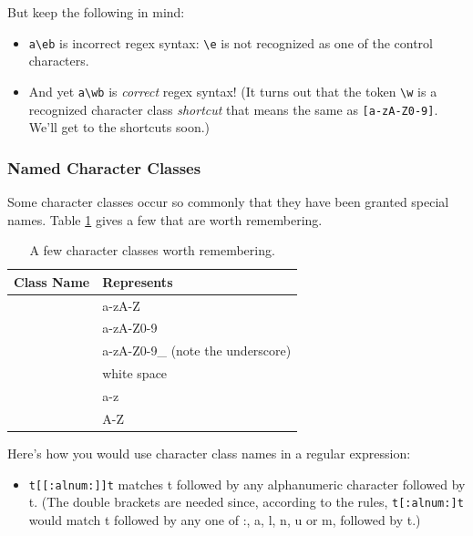 \documentclass[]{book}
\providecommand{\tightlist}{%
  \setlength{\itemsep}{0pt}\setlength{\parskip}{0pt}}
\theoremstyle{definition}
\theoremstyle{definition}
\theoremstyle{remark}
\begin{document}
{But keep the following in mind:

\begin{itemize}
\tightlist
\item
  \texttt{a\textbackslash{}eb} is incorrect regex syntax:
  \texttt{\textbackslash{}e} is not recognized as one of the control
  characters.
\item
  And yet \texttt{a\textbackslash{}wb} is \emph{correct} regex syntax!
  (It turns out that the token \texttt{\textbackslash{}w} is a
  recognized character class \emph{shortcut} that means the same as
  \texttt{{[}a-zA-Z0-9{]}}. We'll get to the shortcuts soon.)
\end{itemize}

\subsubsection{Named Character Classes}\label{named-character-classes}

Some character classes occur so commonly that they have been granted
special names. Table \ref{tab:character-class-names} gives a few that
are worth remembering.

\begin{table}

\caption{\label{tab:character-class-names}A few character classes worth remembering.}
\centering
\begin{tabular}[t]{l|l}
\hline
Class Name & Represents\\
\hline
[:alpha:] & a-zA-Z\\
\hline
[:alnum:] & a-zA-Z0-9\\
\hline
[:word:] & a-zA-Z0-9\_ (note the underscore)\\
\hline
[:space:] & white space\\
\hline
[:lower:] & a-z\\
\hline
[:upper:] & A-Z\\
\hline
\end{tabular}
\end{table}

Here's how you would use character class names in a regular expression:

\begin{itemize}
\tightlist
\item
  \texttt{t{[}{[}:alnum:{]}{]}t} matches t followed by any alphanumeric
  character followed by t. (The double brackets are needed since,
  according to the rules, \texttt{t{[}:alnum:{]}t} would match t
  followed by any one of :, a, l, n, u or m, followed by t.)
\end{itemize}

}
\end{document}

